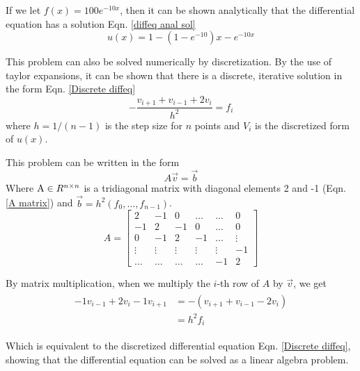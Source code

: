 \documentclass[10pt,showpacs,preprintnumbers,footinbib,amsmath,amssymb,aps,prl,twocolumn,groupedaddress,superscriptaddress,showkeys]{revtex4-1}
\begin{document}
  If we let $f(x) = 100e^{-10x}$, then it can be shown analytically that the differential equation has a solution Eqn. \ref{diffeq anal sol}
  \begin{equation}
    \label{diffeq anal sol}
    u(x) = 1 - (1 - e^{-10})x - e^{-10x}
  \end{equation}

  This problem can also be solved numerically by discretization. By the use of taylor expansions, it can be shown that there is a discrete, iterative solution in the form Eqn. \ref{Discrete diffeq} \cite{lecture_notes}
  \begin{equation}
    \label{Discrete diffeq}
    - \frac{v_{i+1} + v_{i-1} + 2v_i}{h^2} = f_i
  \end{equation}
  where $h = 1/(n-1)$ is the step size for $n$ points and $V_i$ is the discretized form of $u(x)$.

  This problem can be written in the form 
  \begin{equation}
    A\vec v = \vec b
  \end{equation}
  Where $\textup A \in R^{n \times n}$ is a tridiagonal matrix with diagonal elements 2 and -1 (Eqn. \ref{A matrix}) and $\vec b =h^2(f_0, \dots, f_{n-1})$.
  \begin{equation}
    \label{A matrix}
    A = \left[ 
    \begin{matrix}
      2 & -1 & 0 & \dots  & \dots &0 \\
      -1 & 2 & -1 & 0 & \dots &  0 \\
      0 & -1 & 2 & -1 & \dots & \vdots  \\
      \vdots & \vdots & \vdots & \vdots & \vdots & -1\\
      \dots & \dots & \dots & \dots & -1 & 2
    \end{matrix}
    \right]
  \end{equation}

  By matrix multiplication, when we multiply   the $i$-th row of $A$ by $\vec v$, we get
  \begin{align}
  \begin{split}
 -1 v_{i -1} + 2v_i - 1v_{i+1}  &= -\left( v_{i+1} + v_{i-1} - 2v_i\right) 
                                \\&= h^2f_i
  \end{split}
  \end{align}

  Which is equivalent to the discretized differential equation Eqn. \ref{Discrete diffeq},
  showing that the differential equation can be solved as a linear algebra problem. 
\end{document}
